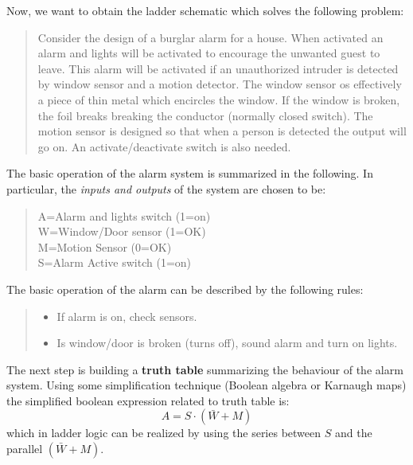 \noindent
Now, we want to obtain the ladder schematic which solves the following problem:
\begin{quotation}\textsf{\noindent
        Consider the design of a burglar alarm for a house. When activated an alarm and lights will be activated to encourage the unwanted guest to leave. This alarm will be activated if an unauthorized intruder is detected by window sensor and a motion detector. The window sensor os effectively a piece of thin metal which encircles the window. If the window is broken, the foil breaks breaking the conductor (normally closed switch). The motion sensor is designed so that when a person is detected the output will go on. An activate/deactivate switch is also needed.}
\end{quotation}
\noindent
The basic operation of the alarm system is summarized in the following. In particular, the \textit{inputs and outputs} of the system are chosen to be:
\begin{quotation}
    \noindent
    A=Alarm and lights switch (1=on)\\
    W=Window/Door sensor (1=OK)\\
    M=Motion Sensor (0=OK)\\
    S=Alarm Active switch (1=on)
\end{quotation}
The basic operation of the alarm can be described by the following rules:
\begin{quotation}\vspace{-0.5cm}\noindent
    \begin{itemize}
        \itemsep-0.3em
        \item If alarm is on, check sensors.
        \item Is window/door is broken (turns off), sound alarm and turn on lights.
    \end{itemize}
\end{quotation}
The next step is building a \textbf{truth table} summarizing the behaviour of the alarm system. Using some simplification technique (Boolean algebra or Karnaugh maps) the simplified boolean expression related to truth table is:
\begin{equation}
    A=S\cdot{(\bar{W}+M)}
\end{equation}
which in ladder logic can be realized by using the series between $S$ and the parallel $(\bar{W}+M)$.   

